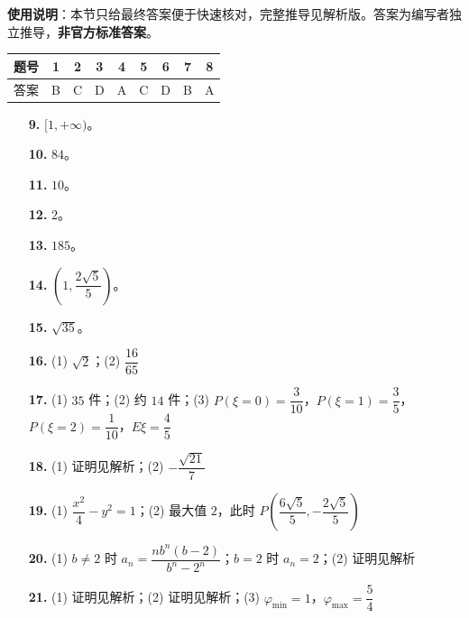 
\begin{gknotice}
\textbf{使用说明}：本节只给最终答案便于快速核对，完整推导见解析版。答案为编写者独立推导，\textbf{非官方标准答案}。
\end{gknotice}

\begin{center}\begin{tabular}{ccccccccc}
\toprule
题号 & 1 & 2 & 3 & 4 & 5 & 6 & 7 & 8 \\
\midrule
答案 & B & C & D & A & C & D & B & A \\
\bottomrule
\end{tabular}\end{center}

\begin{itemize}[leftmargin=2.6em]
  \item[\textbf{9.}] $[1,+\infty)$。
  \item[\textbf{10.}] $84$。
  \item[\textbf{11.}] $10$。
  \item[\textbf{12.}] $2$。
  \item[\textbf{13.}] $185$。
  \item[\textbf{14.}] $\left(1,\dfrac{2\sqrt5}{5}\right)$。
\end{itemize}

\begin{itemize}[leftmargin=2.6em]
  \item[\textbf{15.}] $\sqrt{35}$。
  \item[\textbf{16.}] (1) $\sqrt2$；(2) $\dfrac{16}{65}$
  \item[\textbf{17.}] (1) $35$ 件；(2) 约 $14$ 件；(3) $P(\xi=0)=\dfrac{3}{10}$，$P(\xi=1)=\dfrac35$，$P(\xi=2)=\dfrac{1}{10}$，$E\xi=\dfrac45$
  \item[\textbf{18.}] (1) 证明见解析；(2) $-\dfrac{\sqrt{21}}{7}$
  \item[\textbf{19.}] (1) $\dfrac{x^2}{4}-y^2=1$；(2) 最大值 $2$，此时 $P\left(\dfrac{6\sqrt5}{5},-\dfrac{2\sqrt5}{5}\right)$
  \item[\textbf{20.}] (1) $b\neq2$ 时 $a_n=\dfrac{nb^n(b-2)}{b^n-2^n}$；$b=2$ 时 $a_n=2$；(2) 证明见解析
  \item[\textbf{21.}] (1) 证明见解析；(2) 证明见解析；(3) $\varphi_{\min}=1$，$\varphi_{\max}=\dfrac54$
\end{itemize}

